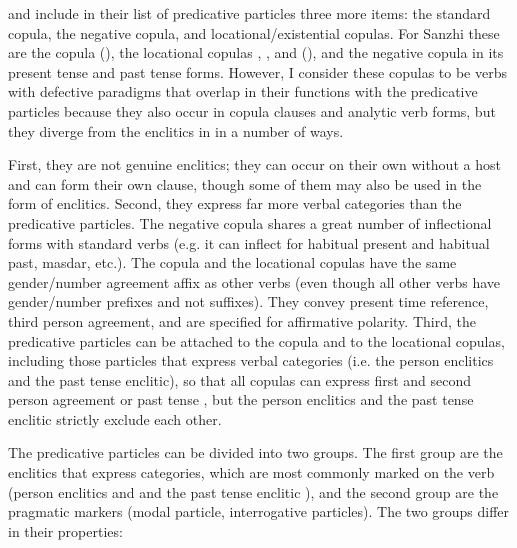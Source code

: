 \citet[138]{Sumbatova.Mutalov2003} and \citet[153]{Sumbatova.Lander2014} include in their list of predicative particles three more items: the standard copula, the negative copula, and locational/existential copulas. For Sanzhi these are the copula  (), the locational copulas , ,  and  (), and the negative copula  in its present tense and past tense forms. However, I consider these copulas to be verbs with defective paradigms that overlap in their functions with the predicative particles because they also occur in copula clauses and analytic verb forms, but they diverge from the enclitics in  in a number of ways.

First, they are not genuine enclitics; they can occur on their own without a host and can form their own clause, though some of them may also be used in the form of enclitics. Second, they express far more verbal categories than the predicative particles. The negative copula shares a great number of inflectional forms with standard verbs (e.g. it can inflect for habitual present and habitual past, masdar, etc.). The copula and the locational copulas have the same gender/number agreement affix as other verbs (even though all other verbs have gender/number prefixes and not suffixes). They convey present time reference, third person agreement, and are specified for affirmative polarity. Third, the predicative particles can be attached to the copula and to the locational copulas, including those particles that express verbal categories (i.e. the person enclitics and the past tense enclitic), so that all copulas can express first and second person agreement or past tense , but the person enclitics and the past tense enclitic strictly exclude each other.

The predicative particles can be divided into two groups. The first group are the enclitics that express categories, which are most commonly marked on the verb (person enclitics  and  and the past tense enclitic ), and the second group are the pragmatic markers (modal particle, interrogative particles). The two groups differ in their properties:

